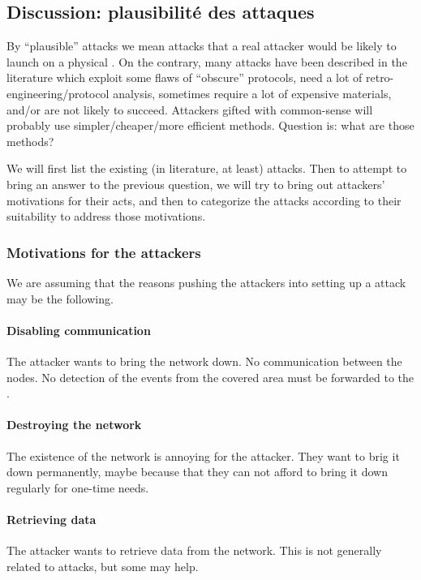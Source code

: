 \subsection{Discussion: plausibilité des attaques}

By ``plausible'' attacks we mean \dos attacks that a real attacker would be likely to launch on a physical \wsn.
On the contrary, many attacks have been described in the literature which exploit some flaws of ``obscure'' protocols, need a lot of retro-engineering/protocol analysis, sometimes require a lot of expensive materials, and/or are not likely to succeed.
Attackers gifted with common-sense will probably use simpler/cheaper/more efficient methods.
Question is: what are those methods?

We will first list the existing (in literature, at least) \dos attacks.
Then to attempt to bring an answer to the previous question, we will try to bring out attackers' motivations for their acts, and then to categorize the attacks according to their suitability to address those motivations.

\subsubsection{Motivations for the attackers}

We are assuming that the reasons pushing the attackers into setting up a \dos attack may be the following.

\paragraph{Disabling communication}
The attacker wants to bring the network down.
No communication between the nodes.
No detection of the events from the covered area must be forwarded to the \bs.

\paragraph{Destroying the network}
The existence of the network is annoying for the attacker.
They want to brig it down permanently, maybe because that they can not afford to bring it down regularly for one-time needs.

\paragraph{Retrieving data}
The attacker wants to retrieve data from the network.
This is not generally related to \dos attacks, but some may help.


